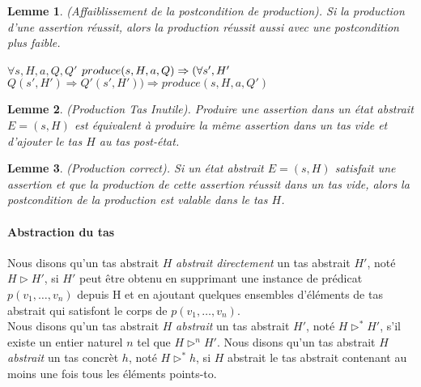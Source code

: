 \documentclass[11pt,openany]{article}
\newtheorem{lemme}{Lemme}
\begin{document}
		\begin{lemme}
			(Affaiblissement de la postcondition de production). Si la production d'une assertion r\'eussit, alors la production r\'eussit aussi avec une postcondition plus faible.
			
$\forall s,H,a,Q,Q'$ $produce(s,H,a,Q)\Rightarrow\\(\forall s', H'$ $Q(s',H')\Rightarrow Q'(s',H'))\Rightarrow produce(s,H,a,Q')$
		\end{lemme}	
		
		\begin{lemme}
		(Production Tas Inutile). Produire une assertion dans un \'etat abstrait $E = (s,H)$  est \'equivalent \`a produire la m\^eme assertion dans un tas vide et d'ajouter le tas $H$ au tas post-\'etat.
		\end{lemme}
	
		\begin{lemme}
		(Production correct). Si un \'etat abstrait $E=(s,H)$ satisfait une assertion et que la production de cette assertion r\'eussit dans un tas vide, alors la postcondition de la production est valable dans le tas $H$.
		\end{lemme}
			\paragraph{Abstraction du tas}
		Nous disons qu'un tas abstrait $H$ \textit{abstrait directement} un tas abstrait $H'$, not\'e $H \rhd H'$, si $H'$ peut \^etre obtenu en supprimant une instance de pr\'edicat $p(v_1,\ldots,v_n)$ depuis H et en ajoutant quelques ensembles d'\'el\'ements de tas abstrait qui satisfont le corps de $p(v_1,\ldots,v_n)$.\\
		Nous disons qu'un tas abstrait $H$ \textit{abstrait} un tas abstrait $H'$, not\'e $H\rhd^* H'$, s'il existe un entier naturel $n$ tel que $H\rhd^n H'$.
		Nous disons qu'un tas abstrait $H$ \textit{abstrait} un tas concr\`et $h$, not\'e $H\rhd^* h$, si $H$ abstrait le tas abstrait contenant au moins une fois tous les \'el\'ements points-to.\\
\end{document}
